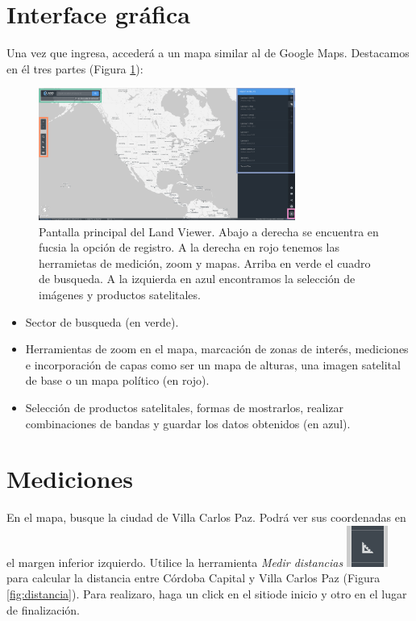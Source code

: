 \documentclass[a4paper,12pt]{book}
\begin{document}
\section{Interface gráfica}

Una vez que ingresa, accederá a un mapa  similar al de Google Maps.
Destacamos en él tres partes (Figura \ref{fig:main}):

\begin{figure}[h!]
    \centering
    \includegraphics[width=0.75\textwidth]{fig:main.png}
    \caption{Pantalla principal del Land Viewer. Abajo a derecha se encuentra en fucsia la opción de registro. A la derecha en rojo tenemos las herramietas de medición, zoom y mapas. Arriba en verde el cuadro de busqueda. A la izquierda en azul encontramos la selección de imágenes y productos satelitales.}
    \label{fig:main}
\end{figure}

\begin{itemize}
    \item Sector de busqueda (en verde).
    \item Herramientas de zoom en el mapa, marcación de zonas de interés,  mediciones e incorporación de capas como ser un mapa de alturas, una imagen satelital de base o un mapa político (en rojo).
    \item Selección de productos satelitales, formas de mostrarlos, realizar combinaciones de bandas y guardar los datos obtenidos (en azul).
\end{itemize}

\section{Mediciones}

En el mapa, busque la ciudad de Villa Carlos Paz. Podrá ver sus coordenadas en el margen inferior izquierdo. Utilice la herramienta \emph{Medir distancias} \includegraphics[scale=0.2]{in:medir.png} para calcular la distancia entre Córdoba Capital y Villa Carlos Paz (Figura \ref{fig:distancia}). Para realizaro, haga un click en el sitiode inicio y otro en el lugar de finalización.
\end{document}
